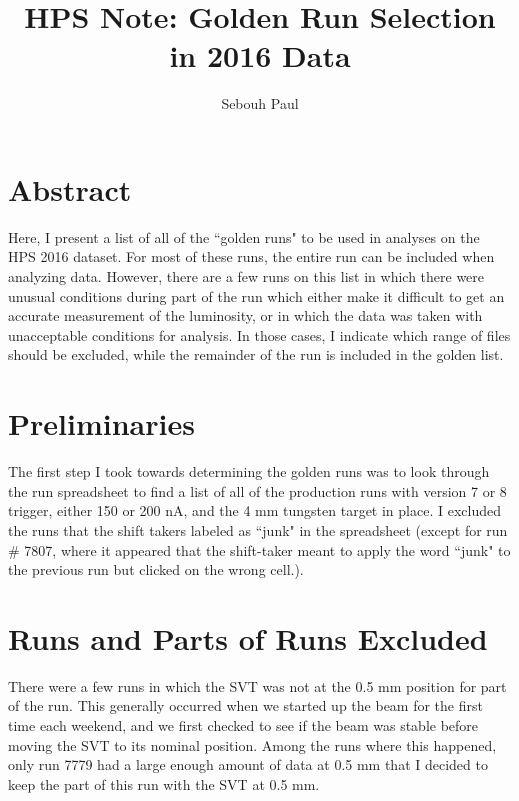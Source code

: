 \documentclass[11pt]{article}
\title{HPS Note:  Golden Run Selection in 2016 Data}
\author{Sebouh Paul}
\date{}                                           %
\begin{document}
\maketitle

\section{Abstract}
Here, I present a list of all of the ``golden runs" to be used in analyses on the HPS 2016 dataset.  For most of these runs, the entire run can be included when analyzing data.   However, there are a few runs on this list in which there were unusual conditions during part of the run which either make it difficult to get an accurate measurement of the luminosity, or in which the data was taken with unacceptable conditions for analysis.  In those cases, I indicate which range of files should be excluded, while the remainder of the run is included in the golden list.  


\section{Preliminaries}
The first step I took towards determining the golden runs was to look through the run spreadsheet to find a list of all of the production runs with version 7 or 8 trigger, either 150 or 200 nA, and the 4 mm tungsten target in place.  I excluded the runs that the shift takers labeled as ``junk" in the spreadsheet (except for run \# 7807, where it appeared that the shift-taker meant to apply the word ``junk" to the previous run but clicked on the wrong cell.).  




\section{Runs and Parts of Runs Excluded}
\label{sec:exclude}
There were a few runs in which the SVT was not at the 0.5 mm position for part of the run.  This generally occurred when we started up the beam for the first time each weekend, and we first checked to see if the beam was stable before moving the SVT to its nominal position.  Among the runs where this happened, only run 7779 had a large enough amount of data at 0.5 mm that I decided to keep the part of this run with the SVT at 0.5 mm.  
\end{document}
